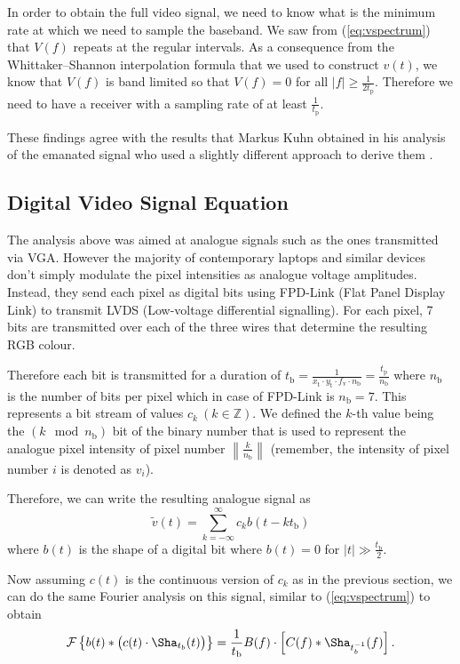 \documentclass[a4paper,12pt,twoside,openright]{report}
\begin{document}
In order to obtain the full video signal, we need to know what is the minimum rate at which we need to sample the baseband. We saw from (\ref{eq:vspectrum}) that $V(f)$ repeats at the regular intervals. As a consequence from the Whittaker--Shannon interpolation formula that we used to construct $v(t)$, we know that $V(f)$ is band limited so that $V(f) = 0$ for all $|f| \geq \frac{1}{2 t_\text{p}}$. Therefore we need to have a receiver with a sampling rate of at least $\frac{1}{t_\text{p}}$.

These findings agree with the results that Markus Kuhn obtained in his analysis of the emanated signal who used a slightly different approach to derive them \cite{kuhn2003compromising}.

\subsection{Digital Video Signal Equation}

The analysis above was aimed at analogue signals such as the ones transmitted via VGA. However the majority of contemporary laptops and similar devices don't simply modulate the pixel intensities as analogue voltage amplitudes. Instead, they send each pixel as digital bits using FPD-Link (Flat Panel Display Link) to transmit LVDS (Low-voltage differential signalling). For each pixel, 7 bits are transmitted over each of the three wires that determine the resulting RGB colour.

Therefore each bit is transmitted for a duration of $t_\text{b}=\frac{1}{x_\text{t} \cdot y_\text{t} \cdot f_\text{v} \cdot n_\text{b}}=\frac{t_\text{p}}{n_\text{b}}$ where $n_\text{b}$ is the number of bits per pixel which in case of FPD-Link is $n_\text{b} = 7$. This represents a bit stream of values $c_{k}\ (k \in \mathbb{Z})$. We defined the $k$-th value being the $(k \mod n_\text{b})$ bit of the binary number that is used to represent the analogue pixel intensity of pixel number $\left\| \frac{k}{n_\text{b}} \right\|$ (remember, the intensity of pixel number $i$ is denoted as $v_{i}$).

Therefore, we can write the resulting analogue signal as
$$\tilde{v}(t) = \sum\limits_{k=-\infty}^{\infty} c_{k} b(t-k t_\text{b})$$
where $b(t)$ is the shape of a digital bit where $b(t)=0$ for $|t| \gg \frac{t_\text{b}}{2}$.

Now assuming $c(t)$ is the continuous version of $c_{k}$ as in the previous section, we can do the same Fourier analysis on this signal, similar to (\ref{eq:vspectrum}) to obtain
\begin{equation} 
\mathcal{F} \left\{ b(t) \ast \big( c(t) \cdot \Sha_{t_{b}} (t) \big) \right\} = \\
\frac{1}{t_\text{b}} B(f) \cdot  \left[ C(f) \ast 
\Sha_{t_{b}^{-1}}(f) 
\right] .
\end{equation}
\end{document}

